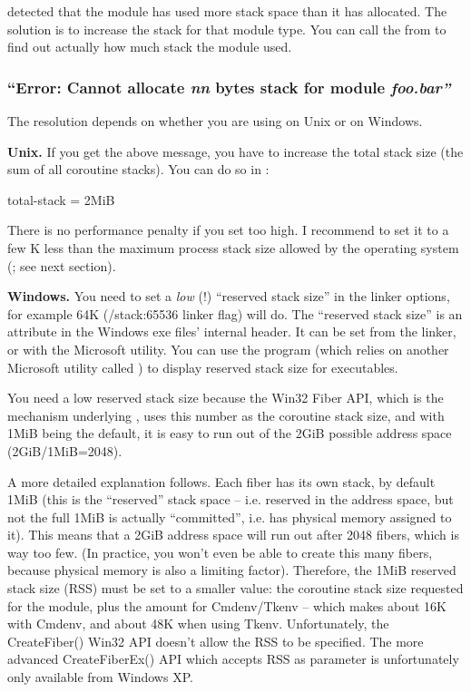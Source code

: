{\opp} detected that the module has used more stack space than it has
allocated. The solution is to increase the stack for that module type.
You can call the  from  to find out
actually how much stack the module used.


\subsubsection{``Error: Cannot allocate \textit{nn} bytes stack for module \textit{foo.bar''}}

The resolution depends on whether you are using {\opp} on Unix or on Windows.

\textbf{Unix.}
If you get the above message, you have to increase the total stack
size (the sum of all coroutine stacks). You can do
so in :

\begin{inifile}
[General]
total-stack = 2MiB
\end{inifile}

There is no performance penalty if you set  too high. I
recommend to set it to a few K less than the maximum process stack
size allowed by the operating system (; see
next section).


\textbf{Windows.}
You need to set a \textit{low} (!) ``reserved stack size''
in the linker options, for example 64K (/stack:65536 linker flag) will do.
The ``reserved stack size'' is an attribute in the Windows exe
files' internal header. It can be set from the linker, or with
the  Microsoft utility. You can use the 
program (which relies on another Microsoft utility called )
to display reserved stack size for executables.

You need a low reserved stack size because the Win32 Fiber API,
which is the mechanism underlying , uses
this number as the coroutine stack size, and with 1MiB being the default,
it is easy to run out of the 2GiB possible address space (2GiB/1MiB=2048).

A more detailed explanation follows.
Each fiber has its own stack, by default 1MiB (this is the ``reserved''
stack space -- i.e. reserved in the address space, but not the full
1MiB is actually ``committed'', i.e. has physical memory assigned to it).
This means that a 2GiB address space will run out after 2048 fibers,
which is way too few. (In practice, you won't even be able to create
this many fibers, because physical memory is also a limiting factor).
Therefore, the 1MiB reserved stack size (RSS) must be set to a smaller
value: the coroutine stack size requested for the module, plus
the  amount for Cmdenv/Tkenv -- which makes
about 16K with Cmdenv, and about 48K when using Tkenv.
Unfortunately, the CreateFiber() Win32 API doesn't allow the RSS to be
specified. The more advanced CreateFiberEx() API which accepts RSS as
parameter is unfortunately only available from Windows XP.

